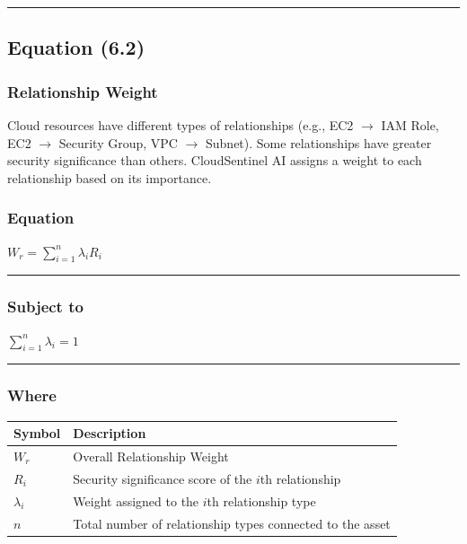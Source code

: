 \begin{center}\rule{0.5\linewidth}{0.5pt}\end{center}

\subsection{Equation (6.2)}

\subsubsection{Relationship Weight}

Cloud resources have different types of relationships (e.g., EC2 \(\rightarrow\) IAM Role, EC2 \(\rightarrow\) Security Group, VPC \(\rightarrow\) Subnet). Some relationships have greater security significance than others. CloudSentinel AI assigns a weight to each relationship based on its importance.

\subsubsection{\texorpdfstring{\textbf{Equation}}{Equation}}

$W_r = \sum_{i=1}^{n} \lambda_i R_i$

\begin{center}\rule{0.5\linewidth}{0.5pt}\end{center}

\subsubsection{Subject to}

$\sum_{i=1}^{n} \lambda_i = 1$

\begin{center}\rule{0.5\linewidth}{0.5pt}\end{center}

\subsubsection{Where}

\begin{longtable}[]{@{}ll@{}}
\toprule\noalign{}
Symbol & Description \\
\midrule\noalign{}
\endhead
\bottomrule\noalign{}
\endlastfoot
$W_r$ & Overall Relationship Weight \\
$R_i$ & Security significance score of the $i$th relationship \\
$\lambda_i$ & Weight assigned to the $i$th relationship type \\
$n$ & Total number of relationship types connected to the asset \\
\end{longtable}

